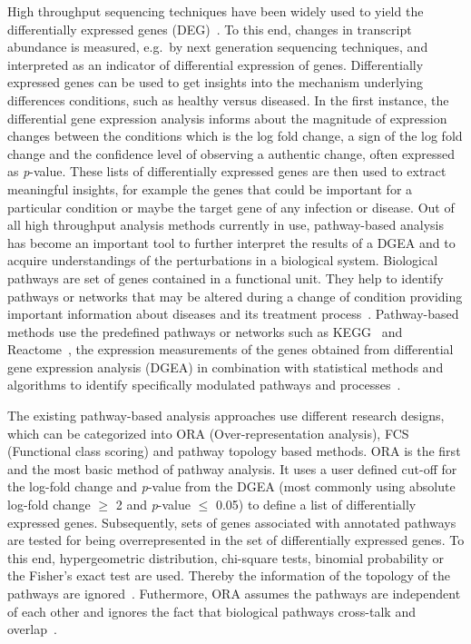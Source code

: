 \documentclass[twocolumn]{article}
\begin{document}
High throughput sequencing techniques have been widely used to yield
the differentially expressed genes (DEG)~\cite{DEG}. To this end,
changes in transcript abundance is measured, e.g.~by next generation
sequencing techniques, and interpreted as an indicator of differential
expression of genes. Differentially expressed genes can be used to get
insights into the mechanism underlying differences conditions, such as
healthy versus diseased. In the first instance, the differential gene
expression analysis informs about the magnitude of expression changes
between the conditions which is the log fold change, a sign of the log fold change and the confidence level
of observing a authentic change, often expressed as
\textit{p}-value. These lists of differentially expressed genes are
then used to extract meaningful insights, for example the genes that
could be important for a particular condition or maybe the target gene
of any infection or disease. Out of all high throughput analysis
methods currently in use, pathway-based analysis has become an
important tool to further interpret the results of a DGEA and to
acquire understandings of the perturbations in a biological
system. Biological pathways are set of genes contained in a functional
unit. They help to identify pathways or networks that may be altered
during a change of condition providing important information about
diseases and its treatment process~\cite{Khatri2012}. Pathway-based
methods use the predefined pathways or networks such as
KEGG~\cite{Kegg} and Reactome~\cite{Reactome}, the expression
measurements of the genes obtained from differential gene expression
analysis (DGEA) in combination with statistical methods and algorithms to
identify specifically modulated pathways and processes~\cite{Campos}.

The existing pathway-based analysis approaches use different research
designs, which can be categorized into ORA (Over-representation
analysis), FCS (Functional class scoring) and pathway topology based
methods. ORA is the first and the most basic method of pathway
analysis. It uses a user defined cut-off for the log-fold change and
\textit{p}-value from the DGEA (most commonly using absolute log-fold change
$\geq$ 2 and \textit{p}-value $\leq$ 0.05) to define a list of
differentially expressed genes. Subsequently, sets of genes associated
with annotated pathways are tested for being overrepresented in the
set of differentially expressed genes. To this end, hypergeometric
distribution, chi-square tests, binomial probability or the Fisher’s
exact test are used. Thereby the information of the topology of the
pathways are ignored~\cite{Bayer}. Futhermore, ORA assumes the
pathways are independent of each other and ignores the fact that
biological pathways cross-talk and overlap~\cite{Khatri2012,Campos}.
\end{document}
